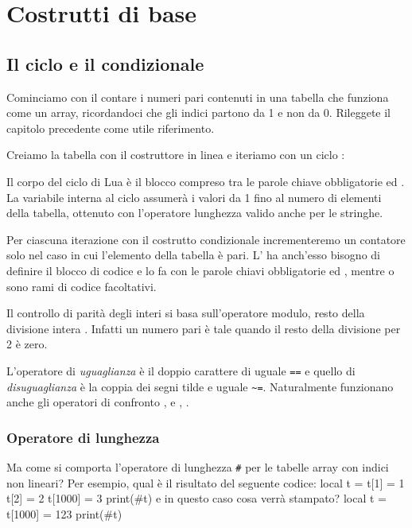 

\chapter{Costrutti di base}

\section{Il ciclo  e il condizionale }
\label{secFondCicloIf}

Cominciamo con il contare i numeri pari contenuti in una tabella che funziona
come un array, ricordandoci che gli indici partono da 1 e non da 0. Rileggete
il capitolo precedente come utile riferimento.

Creiamo la tabella con il costruttore in linea e iteriamo con un ciclo
:

Il corpo del ciclo  di Lua è il blocco compreso tra le parole chiave
obbligatorie  ed . La variabile  interna al ciclo
assumerà i valori da 1 fino al numero di elementi della tabella, ottenuto con
l'operatore lunghezza \key{\#} valido anche per le stringhe.

Per ciascuna iterazione con il costrutto condizionale  incrementeremo un
contatore solo nel caso in cui l'elemento della tabella è pari. L' ha
anch'esso bisogno di definire il blocco di codice e lo fa con le parole chiavi
obbligatorie  ed , mentre  o  sono rami
di codice facoltativi.

Il controllo di parità degli interi si basa sull'operatore modulo, resto della
divisione intera \key{\%}. Infatti un numero pari è tale quando il resto della
divisione per 2 è zero. 

L'operatore di \emph{uguaglianza} è il doppio carattere di uguale \texttt{==} e
quello di \emph{disuguaglianza} è la coppia dei segni tilde e uguale
\verb|~=|. Naturalmente funzionano anche gli operatori di confronto \key{>},
\key{>=} e \key{<}, \key{<=}.


\subsection{Operatore di lunghezza}

Ma come si comporta l'operatore di lunghezza \texttt{\#} per le tabelle array
con indici non lineari? Per esempio, qual è il risultato del seguente codice:
\lines
local t = {}
t[1] = 1
t[2] = 2
t[1000] = 3
print(#t)
\endlines
{}
e in questo caso cosa verrà stampato?
\lines
local t = {}
t[1000] = 123
print(#t)
\endlines
{}

